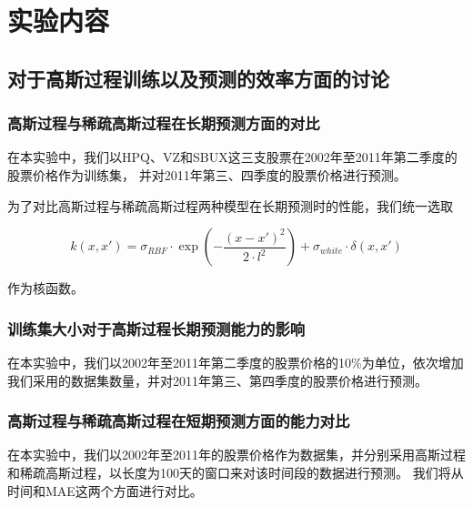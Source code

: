 \section{实验内容}
\subsection{对于高斯过程训练以及预测的效率方面的讨论}
\subsubsection{高斯过程与稀疏高斯过程在长期预测方面的对比}
在本实验中，我们以HPQ、VZ和SBUX这三支股票在2002年至2011年第二季度的股票价格作为训练集，
并对2011年第三、四季度的股票价格进行预测。

为了对比高斯过程与稀疏高斯过程两种模型在长期预测时的性能，我们统一选取

\[
    k(x, x') = \sigma_{RBF}\cdot \exp\left(-\frac{(x - x')^2}{2 \cdot l^2}\right) +  \sigma_{white} \cdot \delta(x, x')
\]

作为核函数。

\subsubsection{训练集大小对于高斯过程长期预测能力的影响}
在本实验中，我们以2002年至2011年第二季度的股票价格的10\%为单位，依次增加我们采用的数据集数量，并对2011年第三、第四季度的股票价格进行预测。

\subsubsection{高斯过程与稀疏高斯过程在短期预测方面的能力对比}

在本实验中，我们以2002年至2011年的股票价格作为数据集，并分别采用高斯过程和稀疏高斯过程，以长度为100天的窗口来对该时间段的数据进行预测。
我们将从时间和MAE这两个方面进行对比。
